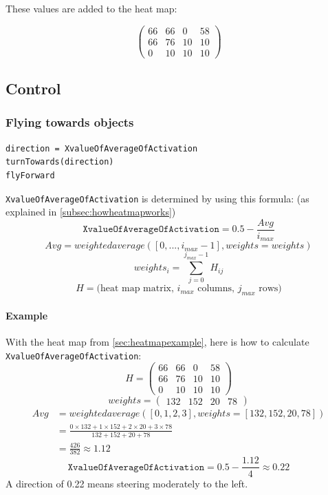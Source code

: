 \documentclass[a4paper,10pt]{article}
\begin{document}
These values are added to the heat map:

\[\left(\begin{array}{cccc}
66 & 66 & 0 & 58 \\
66 & 76 & 10 & 10 \\
0 & 10 & 10 & 10 \end{array}\right)\]

\subsection{Control}

\subsubsection{Flying towards objects\label{flytowards}}
\begin{verbatim}
direction = XvalueOfAverageOfActivation
turnTowards(direction)
flyForward
\end{verbatim}
\texttt{XvalueOfAverageOfActivation} is determined by using this formula: (as explained in \ref{subsec:howheatmapworks})
\[\texttt{XvalueOfAverageOfActivation} = 0.5 - \frac{Avg}{i_{max}}\]
\[Avg = weightedaverage([0, ..., i_{max} - 1], weights=weights)\]
\[weights_i = \sum_{j=0}^{j_{max}-1} H_{ij} \]
\[H = \textrm{(heat map matrix, $i_{max}$ columns, $j_{max}$ rows)}\]
\paragraph{Example}
With the heat map from \ref{sec:heatmapexample}, here is how to calculate
\texttt{XvalueOfAverageOfActivation}:
\[H = \left(\begin{array}{cccc}
66 & 66 & 0 & 58 \\
66 & 76 & 10 & 10 \\
0 & 10 & 10 & 10 \end{array}\right)\]
\[weights = \left(\begin{array}{cccc}
132 & 152 & 20 & 78\end{array}\right)\]
\begin{align*}
Avg &= weightedaverage([0, 1, 2, 3], weights=[132, 152, 20, 78])\\
	&= \frac{0\times 132 + 1\times 152 + 2\times 20 + 3\times 78}
	   {132 + 152 + 20 + 78}\\
	   &= \frac{426}{382} \approx 1.12
\end{align*}
\[\texttt{XvalueOfAverageOfActivation} = 0.5 - \frac{1.12}{4} \approx 0.22 \]
A direction of 0.22 means steering moderately to the left.
\end{document}
